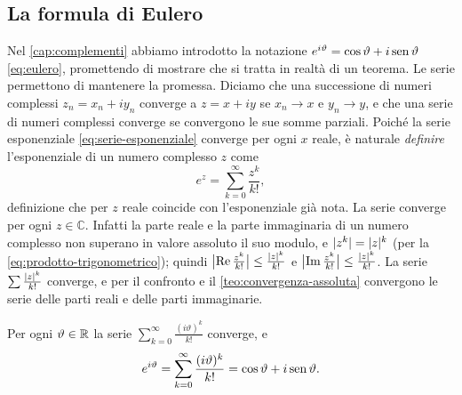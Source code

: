 \subsection{La formula di Eulero}

Nel \cref{cap:complementi} abbiamo introdotto la notazione $e^{i\vartheta}=\cos\vartheta+i\operatorname{sen}\vartheta$
\eqref{eq:eulero}, promettendo di mostrare che si tratta in realtà di un teorema. Le serie
permettono di mantenere la promessa. Diciamo che una successione di numeri complessi
$z_{n}=x_{n}+iy_{n}$ converge a $z=x+iy$ se $x_{n}\to x$ e $y_{n}\to y$, e che una serie di numeri
complessi converge se convergono le sue somme parziali. Poiché la serie esponenziale
\eqref{eq:serie-esponenziale} converge per ogni $x$ reale, è naturale \emph{definire}
l'esponenziale di un numero complesso $z$ come
\begin{equation}\label{eq:esponenziale-complesso}
  e^{z}=\sum_{k=0}^{\infty}\frac{z^{k}}{k!} ,
\end{equation}
definizione che per $z$ reale coincide con l'esponenziale già nota. La serie converge per
ogni $z\in\mathbb C$. Infatti la parte reale e la parte immaginaria di un numero complesso non
superano in valore assoluto il suo modulo, e $\lvert z^{k}\rvert=\lvert z\rvert^{k}$ (per la
\eqref{eq:prodotto-trigonometrico}); quindi
$\bigl|\operatorname{Re}\frac{z^{k}}{k!}\bigr|\le\frac{\lvert z\rvert^{k}}{k!}$ e $\bigl|\operatorname{Im}\frac{z^{k}}{k!}\bigr|\le\frac{\lvert z\rvert^{k}}{k!}$. La serie
$\sum\frac{\lvert z\rvert^{k}}{k!}$ converge, e per il confronto e il \cref{teo:convergenza-assoluta}
convergono le serie delle parti reali e delle parti immaginarie.

\begin{teorema}\label{teo:formula-eulero}
Per ogni $\vartheta\in\mathbb{R}$ la serie $\sum_{k=0}^{\infty}\frac{(i\vartheta)^{k}}{k!}$ converge, e
\begin{equation}\label{eq:formula-eulero}
  e^{i\vartheta}=\sum_{k=0}^{\infty}\frac{(i\vartheta)^{k}}{k!}=\cos\vartheta+i\operatorname{sen}\vartheta .
\end{equation}
\end{teorema}

\begin{schema}
\end{schema}

